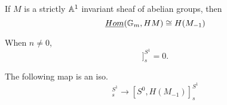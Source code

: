\documentclass{amsart}%
\begin{document}
\begin{lemma}
  If $M$ is a strictly $\mathbb{A}^1$ invariant sheaf of abelian groups, then
  \begin{equation*}
    \underline{Hom}(\mathbb{G}_m, HM) \cong H(M_{-1})
  \end{equation*}
\end{lemma}

\begin{lemma}
When $n\neq 0$,
  \begin{equation}
    [\Sigma^{\infty}\bbG_m, HM[n]]_s^{S^1} = 0.
  \end{equation}

The following map is an iso. 
  \begin{equation}
    [\Sigma^{\infty}\bbG_m, HM]_s^{S^1} \to [S^0, H(M_{-1})]_s^{S^1}
  \end{equation}
\end{lemma}
\end{document}
